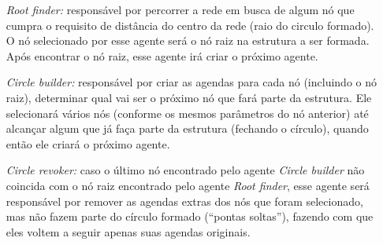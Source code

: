 \begin{itemize}
 \item[\emph{Root finder:}] responsável por percorrer a rede em busca de algum nó que cumpra o requisito de distância do centro da rede (raio do circulo formado). O nó selecionado por esse agente será o nó raiz na estrutura a ser formada. Após encontrar o nó raiz, esse agente irá criar o próximo agente. 
 \item[\emph{Circle builder:}] responsável por criar as agendas para cada nó (incluindo o nó raiz), determinar qual vai ser o próximo nó que fará parte da estrutura. Ele selecionará vários nós (conforme os mesmos parâmetros do nó anterior) até alcançar algum que já faça parte da estrutura (fechando o círculo), quando então ele criará o próximo agente.
 \item[\emph{Circle revoker:}] caso o último nó encontrado pelo agente \emph{Circle builder} não coincida com o nó raiz encontrado pelo agente \emph{Root finder}, esse agente será responsável por remover as agendas extras dos nós que foram selecionado, mas não fazem parte do círculo formado (``pontas soltas''), fazendo com que eles voltem a seguir apenas suas agendas originais.
\end{itemize}

